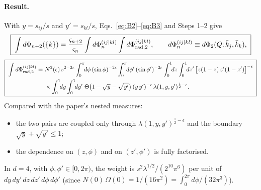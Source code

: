 \documentclass[11pt,a4paper]{article}
\newcommand{\jb}{\bar k_{j}}
\newcommand{\kb}{\bar k_{k}}
\newcommand{\eps}{\epsilon}
\begin{document}
\paragraph{Result.} With $y=s_{ij}/s$ and $y'=s_{kl}/s$, Eqs.~\eqref{eq:B2}--\eqref{eq:B3} and Steps 1--2 give
\begin{equation}
\boxed{\;
\int d\Phi_{n+2}(\{k\})=\frac{\varsigma_{n+2}}{\varsigma_n}\int d\Phi_n^{(ij|kl)}\int d\Phi^{(ij|kl)}_{{\rm rad},2},
\qquad d\Phi_n^{(ij|kl)}\equiv d\Phi_2(Q;\jb,\kb),\;}
\end{equation}
\begin{equation}
\boxed{\;
\begin{aligned}
\int d\Phi^{(ij|kl)}_{{\rm rad},2}
=\;&N^2(\eps)\,s^{2-2\eps}
\int_0^\pi\!\!d\phi\,(\sin\phi)^{-2\eps}\int_0^\pi\!\!d\phi'\,(\sin\phi')^{-2\eps}
\int_0^1\!\!dz\int_0^1\!\!dz'\,\big[z(1-z)\,z'(1-z')\big]^{-\eps}\\
&\times\int_0^1\!\!dy\int_0^1\!\!dy'\;\Theta\big(1-\sqrt y-\sqrt{y'}\big)\,(y\,y')^{-\eps}\,
\lambda(1,y,y')^{\frac12-\eps}.
\end{aligned}\;}
\label{eq:dPhirad2}
\end{equation}
Compared with the paper's nested measures:
\begin{itemize}
\item the two pairs are coupled only through $\lambda(1,y,y')^{\frac12-\eps}$ and the boundary $\sqrt y+\sqrt{y'}\le1$;
\item the dependence on $(z,\phi)$ and on $(z',\phi')$ is fully factorised.
\end{itemize}
In $d=4$, with $\phi,\phi'\in[0,2\pi)$, the weight is $s^2\lambda^{1/2}/(2^{10}\pi^6)$ per unit of $dy\,dy'\,dz\,dz'\,d\phi\,d\phi'$ (since $N(0)\,\Omega(0)=1/(16\pi^2)=\int_0^{2\pi}d\phi/(32\pi^3)$).
\end{document}
